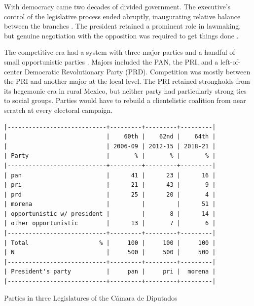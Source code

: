 \documentclass[letter,12pt]{article}
\begin{document}
With democracy came two decades of divided government. The executive's control of the legislative process ended abruptly, inaugurating relative balance between the branches \citep{weldon.1997,lujambio.segl.2000}. The president retained a prominent role in lawmaking, but genuine negotiation with the opposition was required to get things done \citep{casarSinMay2013,bejarQuienLegisla2012}. 

The competitive era had a system with three major parties and a handful of small opportunistic parties \citep[see][]{moreno.decisElec.2009,diaz-estevez-magaloni-Poverty-book.2016}. Majors included the PAN, the PRI, and a left-of-center Democratic Revolutionary Party (PRD). Competition was mostly between the PRI and another major at the local level. The PRI retained strongholds from its hegemonic era in rural Mexico, but neither party had particularly strong ties to social groups. Parties would have to rebuild a clientelistic coalition from near scratch at every electoral campaign.

\begin{table}
\begin{scriptsize}
\begin{verbatim}
|----------------------------+---------+---------+---------|
|                            |    60th |    62nd |    64th |
|                            | 2006-09 | 2012-15 | 2018-21 |
| Party                      |       % |       % |       % |
|----------------------------+---------+---------+---------|
| pan                        |      41 |      23 |      16 |
| pri                        |      21 |      43 |       9 |
| prd                        |      25 |      20 |       4 |
| morena                     |         |         |      51 |
| opportunistic w/ president |         |       8 |      14 |
| other opportunistic        |      13 |       7 |       6 |
|----------------------------+---------+---------+---------|
| Total                    % |     100 |     100 |     100 |
| N                          |     500 |     500 |     500 |
|----------------------------+---------+---------+---------|
| President's party          |     pan |     pri |  morena |
|----------------------------+---------+---------+---------|
\end{verbatim}
\end{scriptsize}
\caption{Parties in three Legislatures of the Cámara de Diputados}\label{T:seats}
\end{table}

\end{document}
